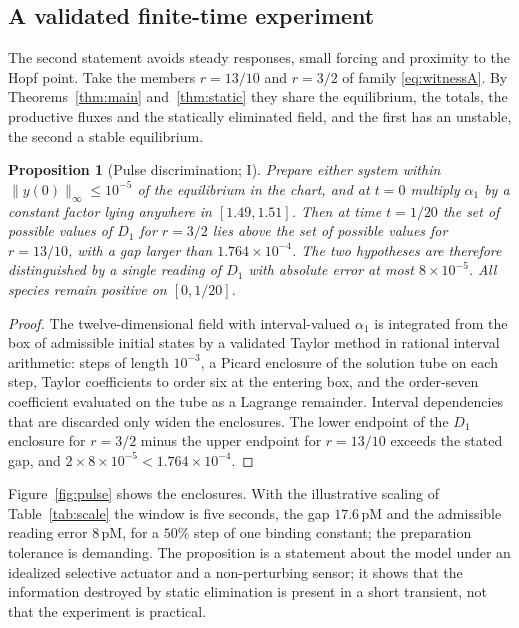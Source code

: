 \documentclass[11pt,a4paper]{article}
\theoremstyle{plain}
\newtheorem{proposition}[theorem]{Proposition}
\theoremstyle{definition}
\theoremstyle{remark}
\newcommand{\evI}{\textsf{I}}
\begin{document}
\subsection{A validated finite-time experiment}
The second statement avoids steady responses, small forcing and proximity to the Hopf point. Take the members $r=13/10$ and $r=3/2$ of family \eqref{eq:witnessA}. By Theorems~\ref{thm:main} and~\ref{thm:static} they share the equilibrium, the totals, the productive fluxes and the statically eliminated field, and the first has an unstable, the second a stable equilibrium.

\begin{proposition}[Pulse discrimination; \evI]\label{prop:pulse}
Prepare either system within $\|y(0)\|_\infty\le10^{-5}$ of the equilibrium in the chart, and at $t=0$ multiply $\alpha_1$ by a constant factor lying anywhere in $[1.49,1.51]$. Then at time $t=1/20$ the set of possible values of $D_1$ for $r=3/2$ lies above the set of possible values for $r=13/10$, with a gap larger than $1.764\times10^{-4}$. The two hypotheses are therefore distinguished by a single reading of $D_1$ with absolute error at most $8\times10^{-5}$. All species remain positive on $[0,1/20]$.
\end{proposition}
\begin{proof}
The twelve-dimensional field with interval-valued $\alpha_1$ is integrated from the box of admissible initial states by a validated Taylor method in rational interval arithmetic: steps of length $10^{-3}$, a Picard enclosure of the solution tube on each step, Taylor coefficients to order six at the entering box, and the order-seven coefficient evaluated on the tube as a Lagrange remainder. Interval dependencies that are discarded only widen the enclosures. The lower endpoint of the $D_1$ enclosure for $r=3/2$ minus the upper endpoint for $r=13/10$ exceeds the stated gap, and $2\times8\times10^{-5}<1.764\times10^{-4}$.
\end{proof}
Figure~\ref{fig:pulse} shows the enclosures. With the illustrative scaling of Table~\ref{tab:scale} the window is five seconds, the gap $17.6$\,pM and the admissible reading error $8$\,pM, for a $50\%$ step of one binding constant; the preparation tolerance is demanding. The proposition is a statement about the model under an idealized selective actuator and a non-perturbing sensor; it shows that the information destroyed by static elimination is present in a short transient, not that the experiment is practical.
\end{document}
